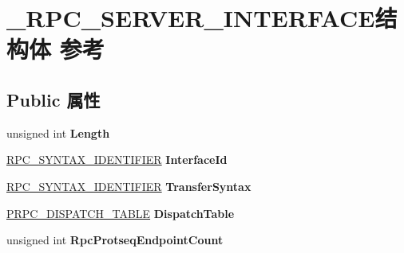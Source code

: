 \hypertarget{struct___r_p_c___s_e_r_v_e_r___i_n_t_e_r_f_a_c_e}{}\section{\+\_\+\+R\+P\+C\+\_\+\+S\+E\+R\+V\+E\+R\+\_\+\+I\+N\+T\+E\+R\+F\+A\+C\+E结构体 参考}
\label{struct___r_p_c___s_e_r_v_e_r___i_n_t_e_r_f_a_c_e}
\subsection*{Public 属性}
\begin{DoxyCompactItemize}
\item 
\mbox{\label{struct___r_p_c___s_e_r_v_e_r___i_n_t_e_r_f_a_c_e_a0c19296744be0db33a2dfe87e697b329}} 
unsigned int {\bfseries Length}
\item 
\mbox{\label{struct___r_p_c___s_e_r_v_e_r___i_n_t_e_r_f_a_c_e_a6028161fc31d1c9a268b08167c09507c}} 
\hyperlink{struct___r_p_c___s_y_n_t_a_x___i_d_e_n_t_i_f_i_e_r}{R\+P\+C\+\_\+\+S\+Y\+N\+T\+A\+X\+\_\+\+I\+D\+E\+N\+T\+I\+F\+I\+ER} {\bfseries Interface\+Id}
\item 
\mbox{\label{struct___r_p_c___s_e_r_v_e_r___i_n_t_e_r_f_a_c_e_a855e06bd84c4d3aa558ca00fdc1104fe}} 
\hyperlink{struct___r_p_c___s_y_n_t_a_x___i_d_e_n_t_i_f_i_e_r}{R\+P\+C\+\_\+\+S\+Y\+N\+T\+A\+X\+\_\+\+I\+D\+E\+N\+T\+I\+F\+I\+ER} {\bfseries Transfer\+Syntax}
\item 
\mbox{\label{struct___r_p_c___s_e_r_v_e_r___i_n_t_e_r_f_a_c_e_ad114ad2b2953e5708eb6208aec0f9487}} 
\hyperlink{struct_r_p_c___d_i_s_p_a_t_c_h___t_a_b_l_e}{P\+R\+P\+C\+\_\+\+D\+I\+S\+P\+A\+T\+C\+H\+\_\+\+T\+A\+B\+LE} {\bfseries Dispatch\+Table}
\item 
\mbox{\label{struct___r_p_c___s_e_r_v_e_r___i_n_t_e_r_f_a_c_e_a1ad243a772c18d6e1b2af1f2afef2df5}} 
unsigned int {\bfseries Rpc\+Protseq\+Endpoint\+Count}
\item 
\mbox{\label{struct___r_p_c___s_e_r_v_e_r___i_n_t_e_r_f_a_c_e_a7053d25948a2a3c18b8d8530271f8496}} 

\end{DoxyCompactItemize}
